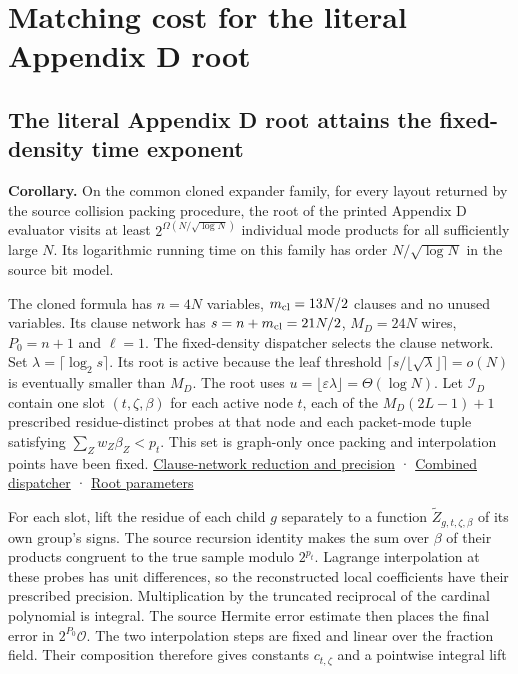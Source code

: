 \documentclass[
  11pt,
]{article}
\begin{document}
\section{Matching cost for the literal Appendix D
root}\label{matching-cost-for-the-literal-appendix-d-root}

\subsection{The literal Appendix D root attains the fixed-density time
exponent}\label{the-literal-appendix-d-root-attains-the-fixed-density-time-exponent}

\textbf{Corollary.} On the common cloned expander family, for every layout returned by the source collision packing procedure, the root of
the printed Appendix D evaluator visits at least
\(2^{\Omega(N/\sqrt{\log N})}\) individual mode products for all
sufficiently large \(N\). Its logarithmic running time on this family
has order \(N/\sqrt{\log N}\) in the source bit model.

The cloned formula has \(n=4N\) variables, \(m_{\rm cl}=13N/2\) clauses
and no unused variables. Its clause network has
\(s=n+m_{\rm cl}=21N/2\), \(M_D=24N\) wires, \(P_0=n+1\) and \(\ell=1\).
The fixed-density dispatcher selects the clause network. Set
\(\lambda=\lceil\log_2s\rceil\). Its root is active because the leaf
threshold \(\lceil s/\lfloor\sqrt\lambda\rfloor\rceil=o(N)\) is
eventually smaller than \(M_D\). The root uses
\(u=\lfloor\varepsilon\lambda\rfloor=\Theta(\log N)\). Let
\(\mathcal I_D\) contain one slot \((t,\zeta,\beta)\) for each active
node \(t\), each of the \(M_D(2L-1)+1\) prescribed residue-distinct
probes at that node and each packet-mode tuple satisfying
\(\sum_Zw_Z\beta_Z<p_t\). This set is graph-only once packing and
interpolation points have been fixed.
\href{https://github.com/openai/math/blob/main/preprints/The-Exponential-Time-Hypothesis-is-False-October-25-2026/build/quantitative-reduction.tex\#L65-L97}{Clause-network
reduction and precision} ·
\href{https://github.com/openai/math/blob/main/preprints/The-Exponential-Time-Hypothesis-is-False-October-25-2026/build/quantitative-reduction.tex\#L362-L369}{Combined
dispatcher} ·
\href{https://github.com/openai/math/blob/main/preprints/The-Exponential-Time-Hypothesis-is-False-October-25-2026/build/quantitative-contraction.tex\#L76-L109}{Root
parameters}

For each slot, lift the residue of each child \(g\) separately to a
function \(\widetilde Z_{g,t,\zeta,\beta}\) of its own group's signs.
The source recursion identity makes the sum over \(\beta\) of their
products congruent to the true sample modulo \(2^{p_t}\). Lagrange
interpolation at these probes has unit differences, so the reconstructed
local coefficients have their prescribed precision. Multiplication by
the truncated reciprocal of the cardinal polynomial is integral. The
source Hermite error estimate then places the final error in
\(2^{P_0}\mathcal O\). The two interpolation steps are fixed and linear
over the fraction field. Their composition therefore gives constants
\(c_{t,\zeta}\) and a pointwise integral lift
\end{document}

